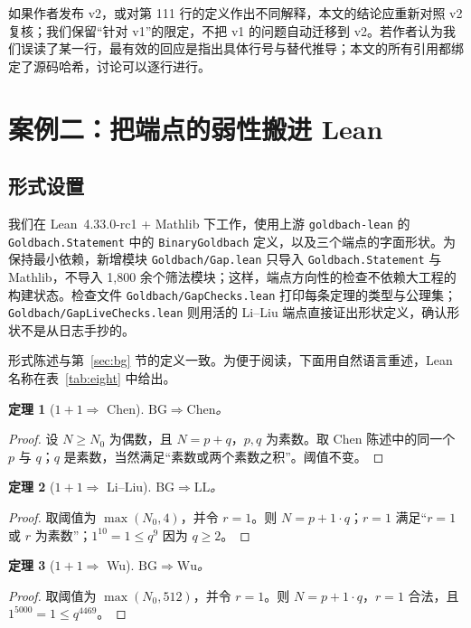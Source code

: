 \documentclass[11pt,a4paper]{ctexart}
\theoremstyle{plain}
\newtheorem{theorem}{定理}[section]
\theoremstyle{definition}
\newcommand{\BG}{\mathrm{BG}}
\newcommand{\Chen}{\mathrm{Chen}}
\newcommand{\LL}{\mathrm{LL}}
\newcommand{\WU}{\mathrm{Wu}}
\begin{document}
如果作者发布 v2，或对第 111 行的定义作出不同解释，本文的结论应重新对照 v2 复核；我们保留“针对 v1”的限定，不把 v1 的问题自动迁移到 v2。若作者认为我们误读了某一行，最有效的回应是指出具体行号与替代推导；本文的所有引用都绑定了源码哈希，讨论可以逐行进行。

\section{案例二：把端点的弱性搬进 Lean}
\label{sec:endpoints}

\subsection{形式设置}
\label{sec:endpoints-setting}

我们在 Lean~4.33.0-rc1 + Mathlib 下工作，使用上游 \texttt{goldbach-lean} 的 \texttt{Goldbach.Statement} 中的 \texttt{BinaryGoldbach} 定义，以及三个端点的字面形状。为保持最小依赖，新增模块 \texttt{Goldbach/Gap.lean} 只导入 \texttt{Goldbach.Statement} 与 Mathlib，不导入 1,800 余个筛法模块；这样，端点方向性的检查不依赖大工程的构建状态。检查文件 \texttt{Goldbach/GapChecks.lean} 打印每条定理的类型与公理集；\texttt{Goldbach/GapLiveChecks.lean} 则用活的 Li--Liu 端点直接证出形状定义，确认形状不是从日志手抄的。

形式陈述与第~\ref{sec:bg} 节的定义一致。为便于阅读，下面用自然语言重述，Lean 名称在表~\ref{tab:eight} 中给出。

\begin{theorem}[$1+1\Rightarrow$ Chen]
\label{thm:bg-chen}
$\BG\Longrightarrow\Chen$。
\end{theorem}
\begin{proof}
设 $N\ge N_0$ 为偶数，且 $N=p+q$，$p,q$ 为素数。取 Chen 陈述中的同一个 $p$ 与 $q$；$q$ 是素数，当然满足“素数或两个素数之积”。阈值不变。
\end{proof}

\begin{theorem}[$1+1\Rightarrow$ Li--Liu]
\label{thm:bg-ll}
$\BG\Longrightarrow\LL$。
\end{theorem}
\begin{proof}
取阈值为 $\max(N_0,4)$，并令 $r=1$。则 $N=p+1\cdot q$；$r=1$ 满足“$r=1$ 或 $r$ 为素数”；$1^{10}=1\le q^9$ 因为 $q\ge2$。
\end{proof}

\begin{theorem}[$1+1\Rightarrow$ Wu]
\label{thm:bg-wu}
$\BG\Longrightarrow\WU$。
\end{theorem}
\begin{proof}
取阈值为 $\max(N_0,512)$，并令 $r=1$。则 $N=p+1\cdot q$，$r=1$ 合法，且 $1^{5000}=1\le q^{4469}$。
\end{proof}
\end{document}
